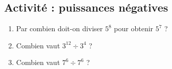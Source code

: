 
\subsection*{Activité : puissances négatives}

\begin{enumerate}
    \item
        Par combien doit-on diviser \( 5^8\) pour obtenir \( 5^7\) ?
    \item
        Combien vaut \( 3^{12}\div 3^{4}\) ?
    \item
        Combien vaut \( 7^{6}\div 7^6\) ?
\end{enumerate}
